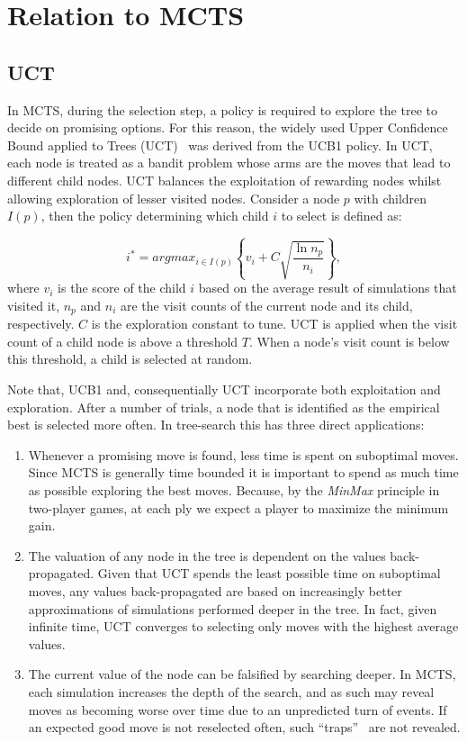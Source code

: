 \documentclass{kecsmstr}
\begin{document}
\newpage

\section{Relation to MCTS}
\label{sec:mabmcts}
\subsection{UCT}
In MCTS, during the selection step, a policy is required to explore the tree to decide on promising options. For this reason, the widely used Upper Confidence Bound applied to Trees (UCT)~ was derived from the UCB1 policy. In UCT, each node is treated as a bandit problem whose arms are the moves that lead to different child nodes. UCT balances the exploitation of rewarding nodes whilst allowing exploration of lesser visited nodes. Consider a node $p$ with children $I(p)$, then the policy determining which child $i$ to select is defined as:

\begin{equation}
\label{eq:uct}
i^* = argmax_{i \in I(p)}\left\{ v_i + C \sqrt{ \frac{\ln{n_p}}{n_i}}\right\},
\end{equation}
where $v_i$ is the score of the child $i$ based on the average result of simulations that visited it, $n_p$ and $n_i$ are the visit counts of the current node and its child, respectively. $C$ is the exploration constant to tune. UCT is applied when the visit count of a child node is above a threshold $T$. When a node's visit count is below this threshold, a child is selected at random.

Note that, UCB1 and, consequentially UCT incorporate both exploitation and exploration. After a number of trials, a node that is identified as the empirical best is selected more often. In tree-search this has three direct applications:
\begin{enumerate} 

\item Whenever a promising move is found, less time is spent on suboptimal moves. Since MCTS is generally time bounded it is important to spend as much time as possible exploring the best moves. Because, by the \emph{MinMax} principle in two-player games, at each ply we expect a player to maximize the minimum gain.

\item The valuation of any node in the tree is dependent on the values back-propagated. Given that UCT spends the least possible time on suboptimal moves, any values back-propagated are based on increasingly better approximations of simulations performed deeper in the tree. In fact, given infinite time, UCT converges to selecting only moves with the highest average values.

\item The current value of the node can be falsified by searching deeper. In MCTS, each simulation increases the depth of the search, and as such may reveal moves as becoming worse over time due to an unpredicted turn of events. If an expected good move is not reselected often, such ``traps''~ are not revealed.

\end{enumerate}
\newpage
\end{document}
